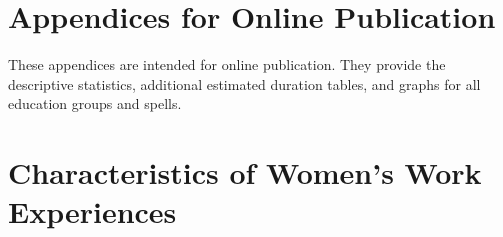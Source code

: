 \documentclass[12pt,letterpaper]{article}
\begin{document}
\clearpage

\onehalfspacing






\clearpage
\newpage

\appendix

\renewcommand\thefigure{\thesection.\arabic{figure}}    
\renewcommand\thetable{\thesection.\arabic{table}}    

\section*{Appendices for Online Publication}

These appendices are intended for online publication.
They provide the descriptive statistics, additional
estimated duration tables, and graphs for all 
education groups and spells.

\clearpage
\newpage

\section{Characteristics of Women's Work Experiences}

\setcounter{figure}{0}
\setcounter{table}{0}
\end{document}
